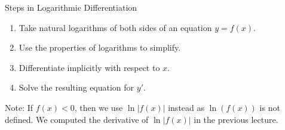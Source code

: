 \begin{frame}
Steps in Logarithmic Differentiation
\begin{enumerate}
\item  Take natural logarithms of both sides of an equation $y = f(x)$.
\item  Use the properties of logarithms to simplify.
\item  Differentiate implicitly with respect to $x$.
\item  Solve the resulting equation for $y'$.
\end{enumerate}
Note: If $f(x) < 0$, then we use $\ln |f(x)|$ instead as $\ln (f(x))$ is not defined. We computed the derivative of $\ln |f(x)|$ in the previous lecture.
\end{frame}
